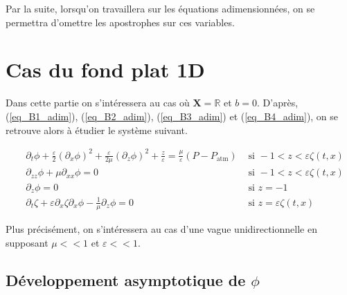 \documentclass[12pt,a4paper]{article}
\numberwithin{equation}{section}
\begin{document}
Par la suite, lorsqu'on travaillera sur les équations adimensionnées, on se permettra d'omettre les apostrophes sur ces variables.
\newpage
\section{Cas du fond plat 1D} 

Dans cette partie on s'intéressera au cas où $\textbf{X} = \mathbb{R}$ et $b = 0$. D'après, (\ref{eq_B1_adim}), (\ref{eq_B2_adim}), (\ref{eq_B3_adim}) et (\ref{eq_B4_adim}), on se retrouve alors à étudier le système suivant.

\begin{align}
~&\partial_{t} \phi + 
     \frac{\varepsilon}{2}(\partial_{x}\phi)^2+ \frac{\varepsilon}{2\mu}(\partial_{z}\phi)^2
     + \frac{z}{\varepsilon} 
     = \frac{\mu}{\varepsilon}(P-P_{\text{atm}}) &\text{ si } -1 < z < \varepsilon \zeta(t,x) \label{eq_k1}\\
~&\partial_{zz}\phi + \mu \partial_{x x}\phi  = 0  &\text{ si } -1 < z < \varepsilon \zeta(t,x) \label{eq_k2}\\
~&\partial_{z}\phi = 0&\text{ si } z  = - 1\label{eq_k3}\\
~&\partial_{t}\zeta +  \varepsilon \partial_{x} \zeta  \partial_{x}\phi  - \frac{1}{\mu}\partial_{z}\phi = 0 &\text{ si } z = \varepsilon \zeta(t,x)\label{eq_k4}
\end{align}

Plus précisément, on s'intéressera au cas d'une vague unidirectionnelle en supposant $\mu << 1$ et $\varepsilon<<1$.
\subsection{Développement asymptotique de $\phi$}
\end{document}
